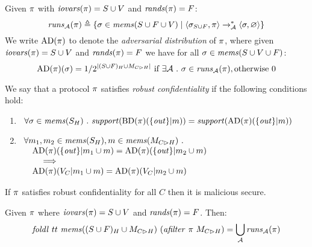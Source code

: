 \begin{definition}
  Given $\pi$ with $\mathit{iovars}(\pi) = S \cup V$ and $\mathit{rands}(\pi) = F$:
  $$
  \mathit{runs}_{\mathcal{A}}(\pi) \triangleq \{ \sigma \in \mathit{mems}(S\cup F \cup V) \mid \langle \sigma_{S \cup F},\pi \rangle \xrightarrow{}^{*}_{\mathcal{A}} \langle \sigma,\varnothing \rangle \}
  $$
  We write $\mathrm{AD}(\pi)$ to denote the \emph{adversarial distribution} of
  $\pi$, where given $\mathit{iovars}(\pi) = S \cup V$ and $\mathit{rands}(\pi) = F$
  we have for all $\sigma \in \mathit{mems}(S \cup V \cup F)$:
  $$
  \mathrm{AD}(\pi)(\sigma) =  1 / 2^{|(S\cup F)_H \cup M_{C \rhd H}|} \ \text{if}\ \exists \mathcal{A}\ .\ \sigma \in \mathit{runs}_{\mathcal{A}}(\pi), \text{otherwise}\ 0
  $$
\end{definition}

\begin{definition}
  We say that a protocol $\pi$ satisfies \emph{robust confidentiality} if the following conditions hold:
  \begin{enumerate}
  \item $\ \,\forall \store \in \mems(S_H) \ .\ \support(\progtt(\prog)(\{ \outv \}|m)) = \support(\att(\prog)(\{ \outv \}|m))$
  \item $\begin{array}[t]{l}\forall m_1, m_2 \in \mathit{mems}(S_H), m \in \mathit{mems}(M_{C \rhd H})\ . \\
    \quad \mathrm{AD}(\pi)(\{ \mathit{out} \} |m_1 \cup m) = \mathrm{AD}(\pi)(\{ \mathit{out} \}|m_2 \cup m) \\
    \qquad \implies\\
    \quad \mathrm{AD}(\pi)(V_C|m_1 \cup m) = \mathrm{AD}(\pi)(V_C|m_2 \cup m)\end{array}$
  \end{enumerate}
\end{definition}


\begin{theorem}
  If $\pi$ satisfies robust confidentiality for all $C$ then it is malicious secure.
\end{theorem}

\begin{lemma}
  \label{lemma-aruns}
  Given $\pi$ where $\mathit{iovars}(\pi) = S \cup V$ and $\mathit{rands}(\pi) = F$. Then:
  $$
  \mathit{foldl}\ {tt}\ \mathit{mems}((S \cup F)_H \cup M_{C \rhd H})\ (\mathit{afilter}\ \pi\ M_{C \rhd H}) = \bigcup_{\mathcal{A}}  \mathit{runs}_{\mathcal{A}}(\pi)
  $$
\end{lemma}
